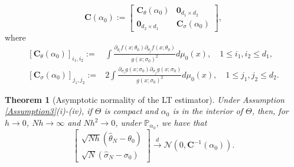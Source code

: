 \documentclass[a4paper,12pt]{article}
\numberwithin{equation}{section}
\theoremstyle{plain}
\newtheorem{theorem}{Theorem}[section]
\theoremstyle{definition}
\begin{document}
\begin{equation}\label{eqn:C alpha0}
    \mathbf{C}(\alpha_0):=\left[\begin{array}{cc}
\mathbf{C}_\theta\left(\alpha_0\right) & \mathbf{0}_{d_1 \times d_2} \\
\mathbf{0}_{d_2 \times d_1} & \mathbf{C}_\sigma\left(\alpha_0\right)
\end{array}\right],
\end{equation}
where 
\begin{align*}
    \left[\mathbf{C}_{\theta}(\alpha_0)\right]_{i_1,i_2}:=&\int \frac{\partial_{\theta_i}f(x;\theta_0)\partial_{\theta_j}f(x;\theta_0)}{g(x;\sigma_0)^2}d\mu_0(x),\quad 1\leq i_1,i_2\leq d_1,\\
    \left[\mathbf{C}_{\sigma}(\alpha_0)\right]_{j_1,j_2}:=&2\int\frac{\partial_{\sigma_i} g(x;\sigma_0)\partial_{\sigma_j}g(x;\sigma_0)}{g(x;\sigma_0)^2}d\mu_0(x),\quad 1\leq j_1,j_2\leq d_2.
\end{align*}
\begin{theorem}[Asymptotic normality of the LT estimator]\label{thrm:asymptotic normality}
    Under Assumption \ref{Assumption3}(i)-(iv), if $\Theta$ is compact and $\alpha_0$ is in the interior of $\Theta$, then, for $h\to 0$, $Nh\to \infty$ and $Nh^2\to 0$, under $\mathbb{P}_{\alpha_0}$, we have that
    \begin{equation}
        \left[\begin{array}{l}
\sqrt{N h}\left(\hat{\theta}_N-\theta_0\right) \\
\sqrt{N}\left(\hat{\sigma}_N-\sigma_0\right)
\end{array}\right]\xrightarrow{d}\mathcal{N}(0,\mathbf{C}^{-1}(\alpha_0)).  
    \end{equation}
\end{theorem}
\end{document}
